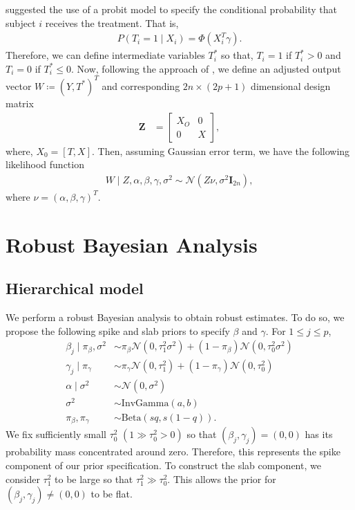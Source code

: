 \documentclass{amsart}
\newcommand{\normal}{\mathcal{N}}
\begin{document}
\citet{koch2020} suggested the use of a probit model to specify the conditional probability that
subject $i$ receives the treatment. That is,
\begin{align}
    P(T_i=1\mid X_i) = \Phi(X_i^T\gamma).
\end{align}
Therefore, we can define intermediate variables $T_i^*$ so that, $T_i=1$ if $T_i^*>0$ and
$T_i=0$ if $T_i^*\le0$. Now, following the approach of \citet{koch2018}, we define an adjusted
output vector $W\coloneqq(Y, T^*)^T$ and corresponding $2n\times(2p+1)$ dimensional design matrix
\begin{align}
    \boldsymbol{Z} &=
    \begin{bmatrix}
     X_O & 0 \\
     0 & X
    \end{bmatrix},
\end{align}
where, $X_0 = [T, X]$. Then, assuming Gaussian error term, we have the following likelihood function
\begin{align}
W\mid Z, \alpha, \beta, \gamma, \sigma^2 \sim\normal\left(Z\nu, \sigma^2\mathbf{I}_{2n}\right),
\end{align}
where $\nu = (\alpha, \beta, \gamma)^T$.

\section{Robust Bayesian Analysis}
\subsection{Hierarchical model}
We perform a robust Bayesian analysis to obtain robust estimates. To do so, we propose the
following spike and slab priors \cite{ishwaran2005} to specify $\beta$ and $\gamma$.
For $1\le j\le p$,
\begin{align}
    \beta_j \mid \pi_{\beta}, \sigma^2 &\sim 
    \pi_{\beta}\normal\left(0, \tau_1^2\sigma^2\right) 
    + (1-\pi_{\beta}) \normal\left(0, \tau_0^2\sigma^2\right)\\
    \gamma_j \mid \pi_{\gamma} &\sim 
    \pi_{\gamma}\normal\left(0, \tau_1^2\right) 
    + (1-\pi_{\gamma}) \normal\left(0, \tau_0^2\right)\\
    \alpha\mid \sigma^2 &\sim \normal(0, \sigma^2)\\
    \sigma^2&\sim \text{InvGamma}(a, b)\\
    \pi_{\beta}, \pi_{\gamma}&\sim\text{Beta}\left(sq, s(1-q)\right).
\end{align}
We fix sufficiently small $\tau^2_0$
$(1\gg\tau_0^2>0)$ so that  $(\beta_j, \gamma_j) = (0,0)$ has its probability mass 
concentrated around zero. Therefore, this represents the spike component of our prior specification. 
To construct the slab component, we consider $\tau_1^2$ to be large so that 
$\tau_1^2\gg\tau_0^2$. This allows the prior for $(\beta_j, \gamma_j)\not=(0,0)$ to be flat.
\end{document}

